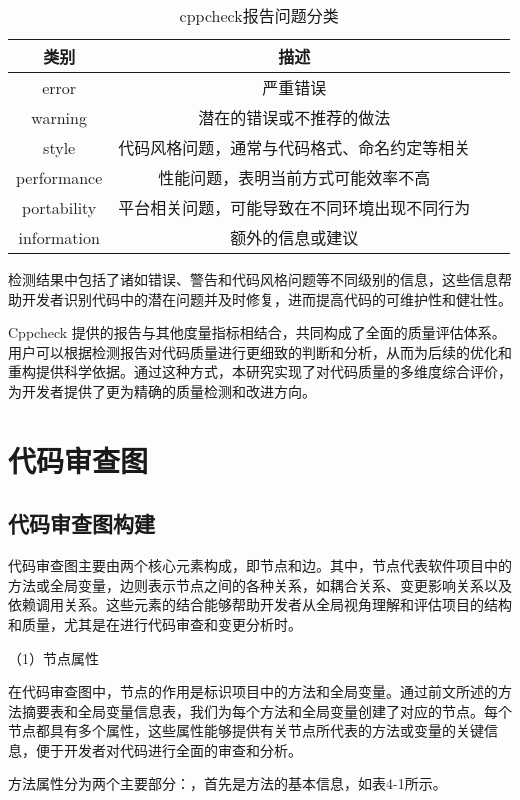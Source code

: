 \begin{table}[htbp]
\caption{cppcheck报告问题分类}
\vspace{0.5em}\centering\wuhao
\begin{tabular}{cccc}
\toprule
类别 & 描述 \\
\midrule
error &  严重错误 \\
warning & 潜在的错误或不推荐的做法 \\
style & 代码风格问题，通常与代码格式、命名约定等相关 \\
performance & 性能问题，表明当前方式可能效率不高 \\ 
portability & 平台相关问题，可能导致在不同环境出现不同行为 \\
information & 额外的信息或建议 \\ 
\bottomrule
\end{tabular}
\end{table}

检测结果中包括了诸如错误、警告和代码风格问题等不同级别的信息，这些信息帮助开发者识别代码中的潜在问题并及时修复，进而提高代码的可维护性和健壮性。

Cppcheck 提供的报告与其他度量指标相结合，共同构成了全面的质量评估体系。用户可以根据检测报告对代码质量进行更细致的判断和分析，从而为后续的优化和重构提供科学依据。通过这种方式，本研究实现了对代码质量的多维度综合评价，为开发者提供了更为精确的质量检测和改进方向。

\section{代码审查图}

\subsection{代码审查图构建}

代码审查图主要由两个核心元素构成，即节点和边。其中，节点代表软件项目中的方法或全局变量，边则表示节点之间的各种关系，如耦合关系、变更影响关系以及依赖调用关系。这些元素的结合能够帮助开发者从全局视角理解和评估项目的结构和质量，尤其是在进行代码审查和变更分析时。

（1）节点属性

在代码审查图中，节点的作用是标识项目中的方法和全局变量。通过前文所述的方法摘要表和全局变量信息表，我们为每个方法和全局变量创建了对应的节点。每个节点都具有多个属性，这些属性能够提供有关节点所代表的方法或变量的关键信息，便于开发者对代码进行全面的审查和分析。

方法属性分为两个主要部分：，首先是方法的基本信息，如表4-1所示。

